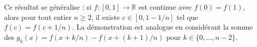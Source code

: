 \documentclass[11pt,a4paper]{article}
\begin{document}
\begin{remark}
Ce résultat se généralise : si $f : [0,1] \to \mathbb{R}$ est continue avec $f(0)=f(1)$, alors pour tout entier $n \ge 2$, il existe $c \in [0, 1 - 1/n]$ tel que $f(c) = f(c + 1/n)$. La démonstration est analogue en considérant la somme des $g_k(x) = f(x + k/n) - f(x + (k+1)/n)$ pour $k \in \{0, \dots, n-2\}$.
\end{remark}
\end{document}
